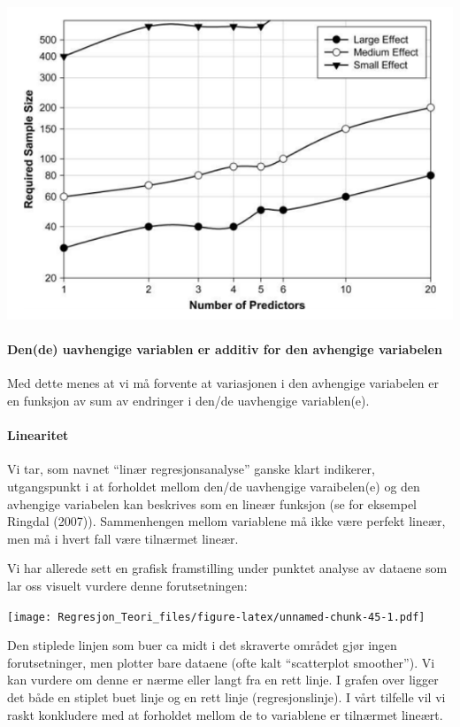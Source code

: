 \documentclass[
]{article}
\begin{document}
\includegraphics{Field_s223.png}

\hypertarget{dende-uavhengige-variablen-er-additiv-for-den-avhengige-variabelen}{%
\paragraph{Den(de) uavhengige variablen er additiv for den avhengige
variabelen}\label{dende-uavhengige-variablen-er-additiv-for-den-avhengige-variabelen}}

Med dette menes at vi må forvente at variasjonen i den avhengige
variabelen er en funksjon av sum av endringer i den/de uavhengige
variablen(e).

\hypertarget{linearitet}{%
\paragraph{Linearitet}\label{linearitet}}

Vi tar, som navnet ``linær regresjonsanalyse'' ganske klart indikerer,
utgangspunkt i at forholdet mellom den/de uavhengige varaibelen(e) og
den avhengige variabelen kan beskrives som en lineær funksjon (se for
eksempel Ringdal (2007)). Sammenhengen mellom variablene må ikke være
perfekt lineær, men må i hvert fall være tilnærmet lineær.

Vi har allerede sett en grafisk framstilling under punktet analyse av
dataene som lar oss visuelt vurdere denne forutsetningen:

\texttt{[image: Regresjon\_Teori\_files/figure-latex/unnamed-chunk-45-1.pdf]}

Den stiplede linjen som buer ca midt i det skraverte området gjør ingen
forutsetninger, men plotter bare dataene (ofte kalt ``scatterplot
smoother''). Vi kan vurdere om denne er nærme eller langt fra en rett
linje. I grafen over ligger det både en stiplet buet linje og en rett
linje (regresjonslinje). I vårt tilfelle vil vi raskt konkludere med at
forholdet mellom de to variablene er tilnærmet lineært.
\end{document}
